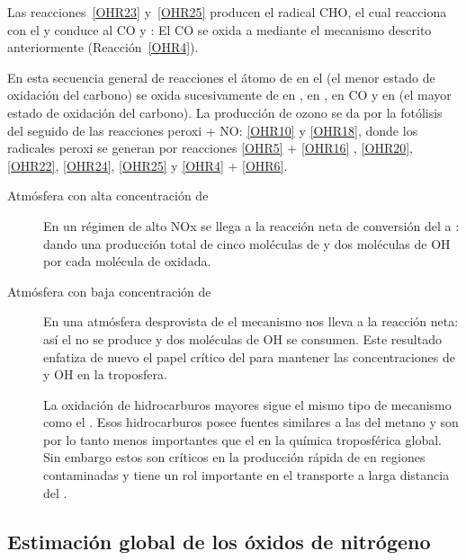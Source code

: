 Las reacciones~\ref{OHR23} y~\ref{OHR25} producen el radical CHO, el cual reacciona con el  y conduce al CO y :
El CO se oxida a  mediante el mecanismo descrito anteriormente (Reacción~\ref{OHR4}).

En esta secuencia general de reacciones el átomo de  en el  (el menor estado de oxidación del carbono) se oxida sucesivamente de  en ,  en ,  en CO y  en   (el mayor estado de oxidación del carbono). La producción de ozono se da por la fotólisis del  seguido de las reacciones peroxi + NO: \ref{OHR10} y \ref{OHR18}, donde los radicales peroxi se generan por reacciones \ref{OHR5} + \ref{OHR16} , \ref{OHR20}, \ref{OHR22}, \ref{OHR24}, \ref{OHR25} y \ref{OHR4} + \ref{OHR6}.
\begin{description}
\item[Atmósfera con alta concentración de ]
En un régimen de alto NOx se llega a la reacción neta de conversión del  a :
dando una producción total de cinco moléculas de  y dos moléculas de OH por cada molécula de  oxidada.
\item[Atmósfera con baja concentración de ]
En una atmósfera desprovista de  el mecanismo nos lleva a la reacción neta:
así el  no se produce y dos moléculas de OH se consumen. Este resultado enfatiza de nuevo el papel crítico del  para mantener las concentraciones de   y OH en la troposfera.

La oxidación de hidrocarburos mayores sigue el mismo tipo de mecanismo como el . Esos hidrocarburos posee fuentes similares a las del metano y son por lo tanto menos importantes que el  en la química troposférica global. Sin  embargo estos son críticos en la producción rápida de   en regiones contaminadas y tiene un rol importante en el transporte a larga distancia del .
\end{description}

\subsection{Estimaci\'on global de los óxidos de nitrógeno }

